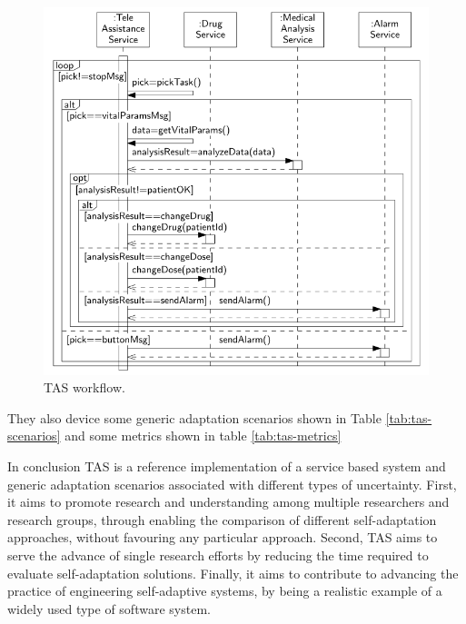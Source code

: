 \begin{figure}[ht]
	\centerline
	{\includegraphics[scale=0.55]{img/tas-workflow.png}}
	\caption[TAS workflow]{TAS workflow\cite{teleassist}.}
	\label{fig:tas-workflow}
\end{figure}

They also device some generic adaptation scenarios shown in Table \ref{tab:tas-scenarios} and some metrics shown in table \ref{tab:tas-metrics}

In conclusion TAS is a reference implementation of a service based system and generic adaptation scenarios associated with different types of uncertainty. First, it aims to promote research and understanding among multiple researchers and research groups, through enabling the comparison of different self-adaptation approaches, without favouring any particular approach. Second, TAS aims to serve the advance of single research efforts by reducing the time required to evaluate self-adaptation solutions. Finally, it aims to contribute to advancing the practice of engineering self-adaptive systems, by being a realistic example of a widely used type of software system.

